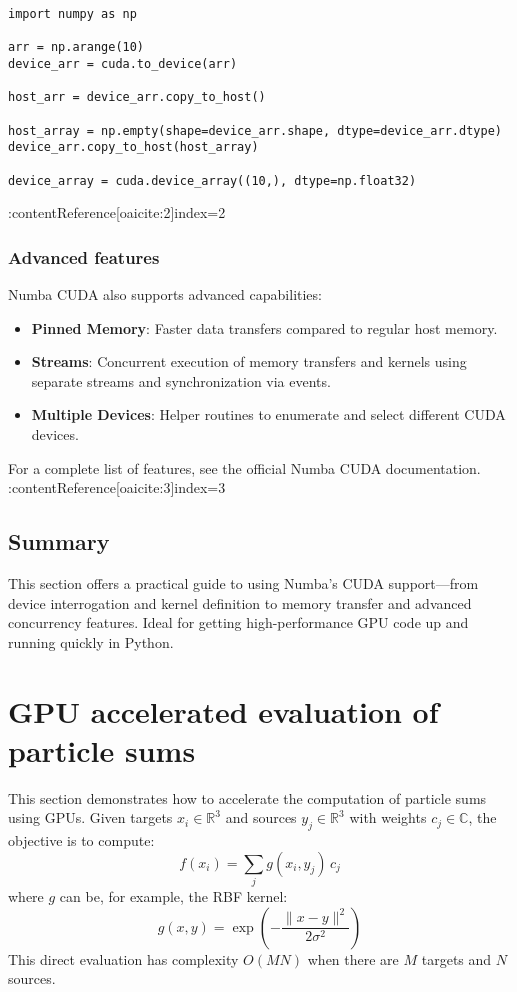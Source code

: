 \documentclass[11pt,a4paper]{book}
\begin{document}
\begin{lstlisting}
import numpy as np

arr = np.arange(10)
device_arr = cuda.to_device(arr)

host_arr = device_arr.copy_to_host()

host_array = np.empty(shape=device_arr.shape, dtype=device_arr.dtype)
device_arr.copy_to_host(host_array)

device_array = cuda.device_array((10,), dtype=np.float32)
\end{lstlisting}
:contentReference[oaicite:2]{index=2}

\subsection*{Advanced features}
Numba CUDA also supports advanced capabilities:

\begin{itemize}
  \item \textbf{Pinned Memory}: Faster data transfers compared to regular host memory.
  \item \textbf{Streams}: Concurrent execution of memory transfers and kernels using separate streams and synchronization via events.
  \item \textbf{Multiple Devices}: Helper routines to enumerate and select different CUDA devices.
\end{itemize}

For a complete list of features, see the official Numba CUDA documentation. :contentReference[oaicite:3]{index=3}

\section*{Summary}
This section offers a practical guide to using Numba’s CUDA support—from device interrogation and kernel definition to memory transfer and advanced concurrency features. Ideal for getting high-performance GPU code up and running quickly in Python.

\chapter{GPU accelerated evaluation of particle sums}

This section demonstrates how to accelerate the computation of particle sums using GPUs. Given targets \(x_i \in \mathbb{R}^3\) and sources \(y_j \in \mathbb{R}^3\) with weights \(c_j \in \mathbb{C}\), the objective is to compute:
\[
f(x_i) = \sum_{j} g(x_i, y_j) \, c_j
\]
where \(g\) can be, for example, the RBF kernel:
\[
g(x, y) = \exp\left( -\frac{\|x - y\|^2}{2 \sigma^2} \right)
\]
This direct evaluation has complexity \(O(MN)\) when there are \(M\) targets and \(N\) sources.
\end{document}
